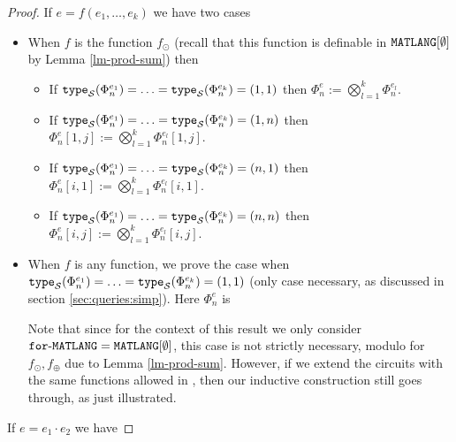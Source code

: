 \begin{proof}
If $e=f(e_1, \ldots, e_k)$ we have two cases

\begin{itemize}
  \item When $f$ is the function $f_{\odot}$ (recall that this function is definable in $\texttt{MATLANG}[\emptyset]$ by Lemma \ref{lm-prod-sum}) then
  \begin{itemize}
    \item If $\texttt{type}_{\mathcal{S}}(\Phi^{e_1}_n)=\ldots =\texttt{type}_{\mathcal{S}}(\Phi^{e_k}_n)=(1, 1)$ then $\Phi^e_n:=\bigotimes_{l=1}^k \Phi^{e_l}_n$.
    \item If $\texttt{type}_{\mathcal{S}}(\Phi^{e_1}_n)=\ldots =\texttt{type}_{\mathcal{S}}(\Phi^{e_k}_n)=(1, n)$ then $\Phi^e_n[1,j]:=\bigotimes_{l=1}^k \Phi^{e_l}_n[1,j]$.
    \item If $\texttt{type}_{\mathcal{S}}(\Phi^{e_1}_n)=\ldots =\texttt{type}_{\mathcal{S}}(\Phi^{e_k}_n)=(n, 1)$ then $\Phi^e_n[i,1]:=\bigotimes_{l=1}^k \Phi^{e_l}_n[i,1]$.
    \item If $\texttt{type}_{\mathcal{S}}(\Phi^{e_1}_n)=\ldots =\texttt{type}_{\mathcal{S}}(\Phi^{e_k}_n)=(n, n)$ then $\Phi^e_n[i,j]:=\bigotimes_{l=1}^k \Phi^{e_l}_n[i,j]$.
  \end{itemize}
	\item When $f$ is any function, we prove the case when $\texttt{type}_{\mathcal{S}}(\Phi^{e_1}_n)=\ldots =\texttt{type}_{\mathcal{S}}(\Phi^{e_k}_n)=(1, 1)$
  (only case necessary, as discussed in section \ref{sec:queries:simp}). Here $\Phi^e_n$ is 
	
\begin{center}
\end{center}

Note that since for the context of this result we only consider $\texttt{for}\text{-}\texttt{MATLANG} = \texttt{MATLANG}[\emptyset]$, this case is not strictly necessary, modulo for $f_\odot,f_\oplus$ due to Lemma \ref{lm-prod-sum}. However, if we extend the circuits with the same functions allowed in \langfor, then our inductive construction still goes through, as just illustrated.

\end{itemize}

If $e=e_1\cdot e_2$ we have


\end{proof}
